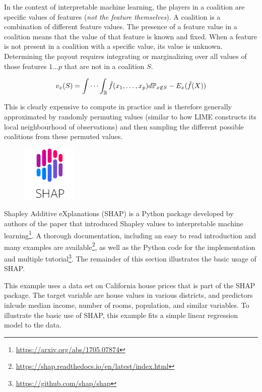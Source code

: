 In the context of interpretable machine learning, the players in a coalition are specific values of features (\emph{not the feature themselves}). A coalition is a combination of different feature values. The presence of a feature value in a coalition means that the value of that feature is known and fixed. When a feature is not present in a coalition with a specific value, its value is unknown. Determining the payout requires integrating or marginalizing over all values of those features $1 \ldots p$ that are not in a coalition $S$.

\begin{align*}
v_x(S) = \idotsint_\Bbb{R} \hat{f}(x_1, \ldots, x_p) d\Bbb{P}_{x \not\in S} - E_x(\hat{f}(X))
\end{align*}

This is clearly expensive to compute in practice and is therefore generally approximated by randomly permuting values (similar to how LIME constructs its local neighbourhood of observations) and then sampling the different possible coalitions from these permuted values. 

\vspace{2\baselineskip}

\begin{figure}
\begin{center}
\includegraphics[height=.45in]{shap_logo.png}
\end{center}
\end{figure}
Shapley Additive eXplanations (SHAP) is a Python package developed by authors of the paper that introduced Shapley values to interpretable machine learning\footnote{\url{https://arxiv.org/abs/1705.07874}}. A thorough documentation, including an easy to read introduction and many examples are available\footnote{\url{https://shap.readthedocs.io/en/latest/index.html}}, as well as the Python code for the implementation and multiple tutorial\footnote{\url{https://github.com/shap/shap}}. The remainder of this section illustrates the basic usage of SHAP.

This example uses a data set on California house prices that is part of the SHAP package. The target variable are house values in various districts, and predictors inlcude median income, number of rooms, population, and similar variables. To illustrate the basic use of SHAP, this example fits a simple linear regression model to the data.

